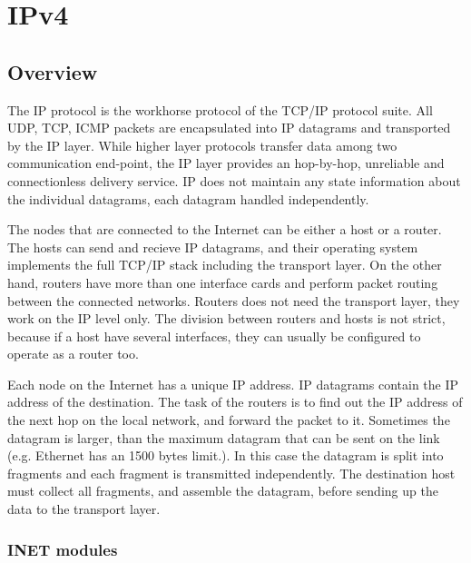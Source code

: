 
\chapter{IPv4}
\label{cha:ipv4}


\section{Overview}

The IP protocol is the workhorse protocol of the TCP/IP protocol suite.
All UDP, TCP, ICMP packets are encapsulated into IP datagrams and
transported by the IP layer.
While higher layer protocols transfer data among two communication end-point,
the IP layer provides an hop-by-hop, unreliable and connectionless delivery
service. IP does not maintain any state information about the individual
datagrams, each datagram handled independently.

The nodes that are connected to the Internet can be either a host or a router.
The hosts can send and recieve IP datagrams, and their operating system
implements the full TCP/IP stack including the transport layer. On the
other hand, routers have more than one interface cards and perform packet
routing between the connected networks. Routers does not need the
transport layer, they work on the IP level only. The division
between routers and hosts is not strict, because if a host
have several interfaces, they can usually be configured to operate
as a router too.

Each node on the Internet has a unique IP address. IP datagrams contain
the IP address of the destination. The task of the routers is to find
out the IP address of the next hop on the local network, and forward
the packet to it. Sometimes the datagram is larger, than the maximum
datagram that can be sent on the link (e.g. Ethernet has an 1500 bytes limit.).
In this case the datagram is split into fragments and each fragment is
transmitted independently. The destination host must collect all fragments,
and assemble the datagram, before sending up the data to the transport
layer.

\subsection{INET modules}


